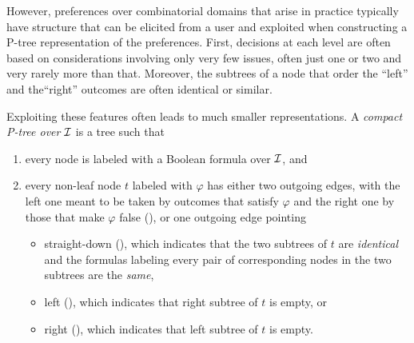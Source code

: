 However, preferences over combinatorial domains that arise in practice
typically have structure that can be elicited from a user and exploited
when constructing a P-tree representation of the preferences. First,
decisions at each level are often based on considerations involving
only very few issues, often just one or two and very rarely more than that.
Moreover, the subtrees of a node that order the ``left'' and the``right''
outcomes are often identical or similar. 

Exploiting these features often leads to much smaller representations.  
A \emph{compact P-tree over} $\mathcal{I}$ is a tree such that
\begin{enumerate}[itemsep=0pt]
	\item every node is labeled with a Boolean formula over $\mathcal{I}$, and
  \item every non-leaf node $t$ labeled with $\varphi$ has either
        two outgoing edges, with the left one meant to be taken by 
        outcomes that satisfy $\varphi$ and the right one by those that
        make $\varphi$ false (), or one 
    outgoing edge pointing
    \begin{itemize}[itemsep=0pt]
      \item straight-down (), which indicates that the two subtrees of $t$ 
            are \textit{identical} and the formulas
            labeling every pair of corresponding nodes in the two subtrees are the \textit{same},
      \item left (), which indicates that right subtree 
      of $t$ is empty, or
      \item right (), which indicates that left subtree 
      of $t$ is empty.
    \end{itemize}
\end{enumerate}

